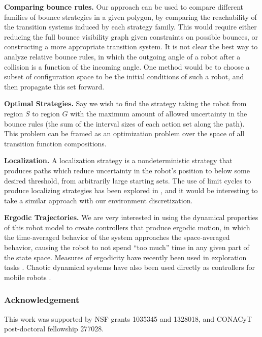 \documentclass[]{styles/svproc}  %
\begin{document}
\textbf{Comparing bounce rules.} Our approach can be used to compare different families of
bounce strategies in a given polygon, by comparing the reachability of the
transition systems induced by each strategy family. This would require 
either reducing the full bounce visibility graph given constraints on
possible bounces, or constructing a more appropriate transition
system. It is not clear the best way to analyze relative bounce rules, in which the
outgoing angle of a robot after a collision is a function of the incoming angle.
One method would be to choose a subset of configuration space to be the initial
conditions of such a robot, and then propagate this set forward.

\textbf{Optimal Strategies.} Say we wish to
find the strategy taking the robot from region $S$ to region $G$ with the
maximum amount of allowed uncertainty in the bounce rules (the sum of the
interval sizes of each action set along the path). This problem can be framed as
an optimization problem over the space of all transition function compositions.

\textbf{Localization.} A localization strategy is a nondeterministic strategy that 
produces paths which reduce uncertainty in the robot's position to below some
desired threshold, from arbitrarily large starting sets. The use of limit cycles
to produce localizing strategies has been explored in \cite{alam2018space}, and
it would be interesting to take a similar approach with our environment
discretization.

\textbf{Ergodic Trajectories.} 
We are very interested in using the dynamical properties of this robot model to
create controllers that produce ergodic motion, in which the time-averaged
behavior of the system approaches the space-averaged behavior, causing the robot
to not spend ``too much'' time in any given part of the state space. Measures
of ergodicity have recently been used in exploration tasks
\cite{miller2016ergodic}. Chaotic dynamical systems have also been used directly
as controllers for mobile robots \cite{nakamura2001chaotic}.


\subsubsection{Acknowledgement} This work was supported by NSF grants 1035345 and 1328018, and CONACyT
post-doctoral fellowship 277028.
\end{document}
